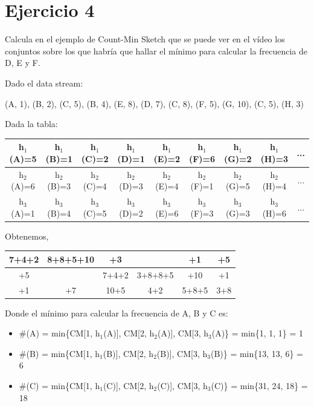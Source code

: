 \documentclass{uimppracticas}
\begin{document}
\section{Ejercicio 4}

Calcula en el ejemplo de Count-Min Sketch que se puede ver en el vídeo los conjuntos sobre los que habría que hallar el mínimo para calcular la frecuencia de D, E y F. 

Dado el data stream:

\begin{center}
	(A, 1), (B, 2), (C, 5), (B, 4), (E, 8), (D, 7), (C, 8), (F, 5), (G, 10), (C, 5), (H, 3)
\end{center}

Dada la tabla:

\begin{center}
	\begin{tabular}{|c|c|c|c|c|c|c|c|c|}
		\hline
		h$_{1}$(A)=5 & h$_{1}$(B)=1 & h$_{1}$(C)=2 & h$_{1}$(D)=1 & h$_{1}$(E)=2 & h$_{1}$(F)=6 & h$_{1}$(G)=2 & h$_{1}$(H)=3 & ... \\ \hline
		h$_{2}$(A)=6 & h$_{2}$(B)=3 & h$_{2}$(C)=4 & h$_{2}$(D)=3 & h$_{2}$(E)=4 & h$_{2}$(F)=1 & h$_{2}$(G)=5 & h$_{2}$(H)=4 & ... \\ \hline
		h$_{3}$(A)=1 & h$_{3}$(B)=4 & h$_{3}$(C)=5 & h$_{3}$(D)=2 & h$_{3}$(E)=6 & h$_{3}$(F)=3 & h$_{3}$(G)=3 & h$_{3}$(H)=6 & ... \\ \hline
	\end{tabular}
\end{center}

Obtenemos,

\begin{center}
	\begin{tabular}{|c|c|c|c|c|c|}
		\hline
		7+4+2 & 8+8+5+10 & +3 &  & +1 & +5 \\ \hline
		+5 &  & 7+4+2 & 3+8+8+5 & +10 & +1 \\ \hline
		+1 & +7 & 10+5 & 4+2 & 5+8+5 & 3+8 \\ \hline
	\end{tabular}
\end{center}

Donde el mínimo para calcular la frecuencia de A, B y C es:

\begin{itemize}
	\item \#(A) = min\{CM[1, h$_{1}$(A)], CM[2, h$_{2}$(A)], CM[3, h$_{3}$(A)\} = min\{1, 1, 1\} = 1 
	\item \#(B) = min\{CM[1, h$_{1}$(B)], CM[2, h$_{2}$(B)], CM[3, h$_{3}$(B)\} = min\{13, 13, 6\} = 6 
	\item \#(C) = min\{CM[1, h$_{1}$(C)], CM[2, h$_{2}$(C)], CM[3, h$_{3}$(C)\} = min\{31, 24, 18\} = 18
\end{itemize}
\end{document}
